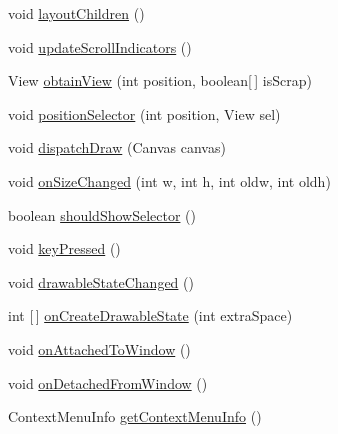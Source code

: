 \begin{DoxyCompactItemize}
\item 
void \hyperlink{classit_1_1sephiroth_1_1android_1_1library_1_1widget_1_1_abs_h_list_view_a8b0614ea0ed2b428e60590d50a3060ea}{layout\+Children} ()
\item 
void \hyperlink{classit_1_1sephiroth_1_1android_1_1library_1_1widget_1_1_abs_h_list_view_a911d741302265f8e3d0f72b867f8a04d}{update\+Scroll\+Indicators} ()
\item 
View \hyperlink{classit_1_1sephiroth_1_1android_1_1library_1_1widget_1_1_abs_h_list_view_af947e6a2395b66358ba023875bde8079}{obtain\+View} (int position, boolean\mbox{[}$\,$\mbox{]} is\+Scrap)
\item 
void \hyperlink{classit_1_1sephiroth_1_1android_1_1library_1_1widget_1_1_abs_h_list_view_a040ff346bf8df2b370bc574aba81a039}{position\+Selector} (int position, View sel)
\item 
void \hyperlink{classit_1_1sephiroth_1_1android_1_1library_1_1widget_1_1_abs_h_list_view_a633c4c4d187d1730e54b09229f099688}{dispatch\+Draw} (Canvas canvas)
\item 
void \hyperlink{classit_1_1sephiroth_1_1android_1_1library_1_1widget_1_1_abs_h_list_view_a56f84424f796721fe24768734cf8294c}{on\+Size\+Changed} (int w, int h, int oldw, int oldh)
\item 
boolean \hyperlink{classit_1_1sephiroth_1_1android_1_1library_1_1widget_1_1_abs_h_list_view_a0b6af5d40d8a4df7cf6d91708e37c3d4}{should\+Show\+Selector} ()
\item 
void \hyperlink{classit_1_1sephiroth_1_1android_1_1library_1_1widget_1_1_abs_h_list_view_a3e2a64a3d3f699f85263d9c92f9bd5c3}{key\+Pressed} ()
\item 
void \hyperlink{classit_1_1sephiroth_1_1android_1_1library_1_1widget_1_1_abs_h_list_view_a70c16b62515470c36ee415e1d97535fd}{drawable\+State\+Changed} ()
\item 
int \mbox{[}$\,$\mbox{]} \hyperlink{classit_1_1sephiroth_1_1android_1_1library_1_1widget_1_1_abs_h_list_view_a19d44121b58c45be0aee1aaf167b27f9}{on\+Create\+Drawable\+State} (int extra\+Space)
\item 
void \hyperlink{classit_1_1sephiroth_1_1android_1_1library_1_1widget_1_1_abs_h_list_view_a7b9240f45a4f371750bf2377edef8037}{on\+Attached\+To\+Window} ()
\item 
void \hyperlink{classit_1_1sephiroth_1_1android_1_1library_1_1widget_1_1_abs_h_list_view_a9971843d921efa1e4845ad79b51f2b43}{on\+Detached\+From\+Window} ()
\item 
Context\+Menu\+Info \hyperlink{classit_1_1sephiroth_1_1android_1_1library_1_1widget_1_1_abs_h_list_view_aae39a41152b32f1e3a95549673167d59}{get\+Context\+Menu\+Info} ()

\end{DoxyCompactItemize}
